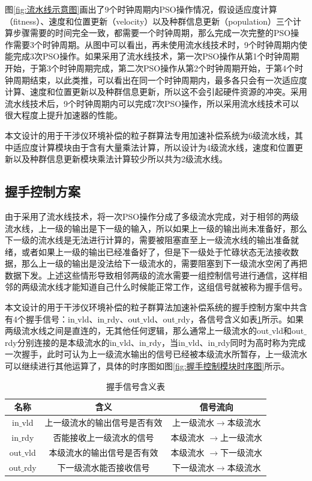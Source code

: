 图\ref{fig:流水线示意图}画出了9个时钟周期内PSO操作情况，假设适应度计算（fitness）、速度和位置更新（velocity）以及种群信息更新（population）三个计算步骤需要的时间完全一致，都需要一个时钟周期，那么完成一次完整的PSO操作需要3个时钟周期。从图中可以看出，再未使用流水线技术时，9个时钟周期内使能完成3次PSO操作。如果采用了流水线技术，第一次PSO操作从第1个时钟周期开始，于第3个时钟周期完成，第二次PSO操作从第2个时钟周期开始，于第4个时钟周期结束，以此类推，可以看出在同一个时钟周期内，最多各只会有一次适应度计算、速度和位置更新以及种群信息更新，所以这不会引起硬件资源的冲突。采用流水线技术后，9个时钟周期内可以完成7次PSO操作，所以采用流水线技术可以很大程度上提升加速器的性能。

本文设计的用于干涉仪环境补偿的粒子群算法专用加速补偿系统为6级流水线，其中适应度计算模块由于含有大量乘法计算，所以设计为4级流水线，速度和位置更新以及种群信息更新模块乘法计算较少所以共为2级流水线。

\subsection{握手控制方案}
\label{握手控制方案}
由于采用了流水线技术，将一次PSO操作分成了多级流水完成，对于相邻的两级流水线，上一级的输出是下一级的输入，所以如果上一级的输出尚未准备好，那么下一级的流水线是无法进行计算的，需要被阻塞直至上一级流水线的输出准备就绪，或者如果上一级的输出已经准备好了，但是下一级处于忙碌状态无法接收数据，那么上一级的输出是没法给下一级流水的，需要阻塞到下一级流水空闲了再把数据下发。上述这些情形导致相邻两级的流水需要一组控制信号进行通信，这样相邻的两级流水线才能知道自己什么时候能正常工作，这组信号就被称为握手信号。

本文设计的用于干涉仪环境补偿的粒子群算法加速补偿系统的握手控制方案中共含有4个握手信号：in$\_$vld、in$\_$rdy、out$\_$vld、out$\_$rdy，各信号含义如表\ref{tab:握手信号含义表}所示。如果两级流水线之间是直连的，无其他任何逻辑，那么通常上一级流水的out$\_$vld和out$\_$rdy分别连接的是本级流水的in$\_$vld、in$\_$rdy，当in$\_$vld、in$\_$rdy同时为高时称为完成一次握手，此时可认为上一级流水输出的信号已经被本级流水所暂存，上一级流水可以继续进行其他运算了，具体的时序图如图\ref{fig:握手控制模块时序图}所示。
\begin{table}[H]
    \centering
    \caption{握手信号含义表}
    \label{tab:握手信号含义表}
    \begin{tabular}{c|c|c}
        \hline
        名称                               & 含义                   &  信号流向         \\ \hline
        in$\_$vld              & 上一级流水的输出信号是否有效           &上一级流水$\rightarrow$本级流水        \\ \hline
        in$\_$rdy              & 否能接收上一级流水的信号              &本级流水  $\rightarrow$上一级流水       \\ \hline
        out$\_$vld             & 本级流水的输出信号是否有效            & 本级流水 $\rightarrow$下一级流水       \\ \hline
        out$\_$rdy             & 下一级流水能否接收信号                & 下一级流水$\rightarrow$本级流水       \\ \hline
    \end{tabular}
  \end{table}

